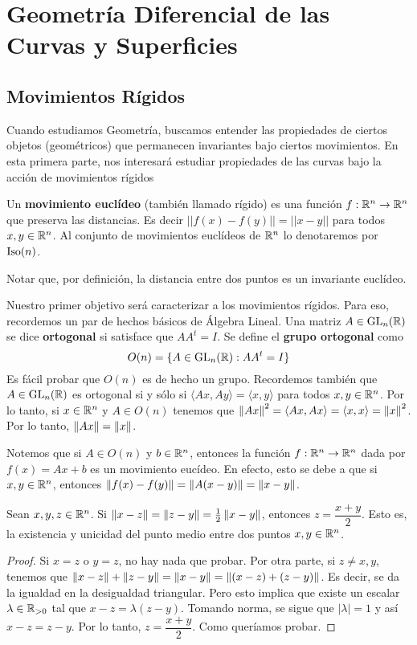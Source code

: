 \chapter{Geometría Diferencial de las Curvas y Superficies}

\section{Movimientos Rígidos}

Cuando estudiamos Geometría, buscamos entender las propiedades de ciertos objetos (geométricos) que permanecen invariantes bajo ciertos movimientos. En esta primera parte, nos interesará estudiar propiedades de las curvas bajo la acción de movimientos rígidos

\begin{defn}
Un \textbf{movimiento euclídeo} (también llamado rígido) es una función $f:\mathbb{R}^n\to\mathbb{R}^n$ que preserva las distancias. Es decir $||f(x)-f(y)||=||x-y||$ para todos $x,y\in\mathbb{R}^n$. Al conjunto de movimientos euclídeos de $\mathbb{R}^n$ lo denotaremos por $\operatorname{Iso}(n)$.
\end{defn}

\begin{obs}
Notar que, por definición, la distancia entre dos puntos es un invariante euclídeo.
\end{obs}

Nuestro primer objetivo será caracterizar a los movimientos rígidos. Para eso, recordemos un par de hechos básicos de Álgebra Lineal. Una matriz $A\in\operatorname{GL}_n(\mathbb{R})$ se dice \textbf{ortogonal} si satisface que $AA^t=I$. Se define el \textbf{grupo ortogonal} como $$O(n)=\{A\in\operatorname{GL}_{n}(\mathbb{R}) : AA^{t}=I\}$$ Es fácil probar que $O(n)$ es de hecho un grupo. Recordemos también que $A\in\operatorname{GL}_n(\mathbb{R})$ es ortogonal si y sólo si $\langle Ax,Ay\rangle = \langle x,y\rangle$ para todos $x,y\in\mathbb{R}^n$. Por lo tanto, si $x\in\mathbb{R}^n$ y $A\in O(n)$ tenemos que $\left\| Ax \right\|^2 = \langle Ax,Ax\rangle = \langle x,x\rangle = \left\| x \right\|^2$. Por lo tanto, $\left\| Ax \right\|=\left\| x \right\|$.

Notemos que si $A\in O(n)$ y $b\in\mathbb{R}^n$, entonces la función $f:\mathbb{R}^n\to\mathbb{R}^n$ dada por $f(x)=Ax+b$ es un movimiento eucídeo. En efecto, esto se debe a que si $x,y\in\mathbb{R}^n$, entonces $\left\| f(x)-f(y) \right\| = \left\| A(x-y) \right\| = \left\| x-y \right\|$.

\begin{lem}
\label{lem::ptomedio}
Sean $x,y,z\in\mathbb{R}^n$. Si $\left\| x-z \right\| = \left\| z-y \right\| = \frac{1}{2}\left\| x-y \right\|$, entonces $z=\dfrac{x+y}{2}$. Esto es, la existencia y unicidad del punto medio entre dos puntos $x,y\in\mathbb{R}^n$.
\begin{proof}
Si $x=z$ o $y=z$, no hay nada que probar. Por otra parte, si $z\neq x,y$, tenemos que $\left\| x-z \right\|+\left\| z-y \right\| = \left\| x-y \right\| = \left\| (x-z)+(z-y) \right\|$. Es decir, se da la igualdad en la desigualdad triangular. Pero esto implica que existe un escalar $\lambda\in\mathbb{R}_{>0}$ tal que $x-z = \lambda(z-y)$. Tomando norma, se sigue que $|\lambda|=1$ y así $x-z=z-y$. Por lo tanto, $z=\dfrac{x+y}{2}$. Como queríamos probar.
\end{proof}
\end{lem}

